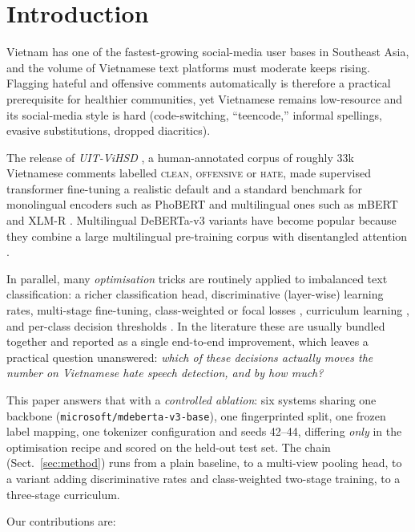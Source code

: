 \section{Introduction}
\label{sec:intro}

Vietnam has one of the fastest-growing social-media user bases in Southeast Asia,
and the volume of Vietnamese text platforms must moderate keeps rising.  Flagging
hateful and offensive comments automatically is therefore a practical prerequisite
for healthier communities, yet Vietnamese remains low-resource and its social-media
style is hard (code-switching, ``teencode,'' informal spellings, evasive
substitutions, dropped diacritics).

The release of \emph{UIT-ViHSD} \cite{luu2021vihsd}, a human-annotated corpus of
roughly 33k Vietnamese comments labelled \textsc{clean}, \textsc{offensive} or
\textsc{hate}, made supervised transformer fine-tuning a realistic default and a
standard benchmark for monolingual encoders such as PhoBERT \cite{nguyen2020phobert}
and multilingual ones such as mBERT and XLM-R
\cite{conneau2020xlmr,nguyen2022smtce,hoang2023vihos}.  Multilingual DeBERTa-v3
variants have become popular because they combine a large multilingual pre-training
corpus with disentangled attention \cite{he2021deberta,he2023debertav3}.

In parallel, many \emph{optimisation} tricks are routinely applied to imbalanced
text classification: a richer classification head, discriminative (layer-wise)
learning rates, multi-stage fine-tuning, class-weighted or focal losses
\cite{lin2017focal}, curriculum learning \cite{bengio2009curriculum}, and per-class
decision thresholds \cite{saito2015precision}.  In the literature these are usually
bundled together and reported as a single end-to-end improvement, which leaves a
practical question unanswered: \emph{which of these decisions actually moves the
number on Vietnamese hate speech detection, and by how much?}

This paper answers that with a \emph{controlled ablation}: six systems sharing one
backbone (\texttt{microsoft/mdeberta-v3-base}), one fingerprinted split, one frozen
label mapping, one tokenizer configuration and seeds 42--44, differing \emph{only} in
the optimisation recipe and scored on the held-out test set.  The chain
(Sect.~\ref{sec:method}) runs from a plain baseline, to a multi-view pooling head,
to a variant adding discriminative rates and class-weighted two-stage training, to a
three-stage curriculum.

Our contributions are:

